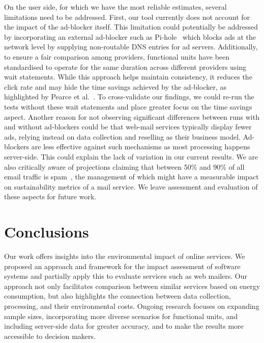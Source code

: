 \documentclass[sigconf,9pt,usenames,dvipsnames,table]{acmart}
\begin{document}
On the user side, for which we have the most reliable estimates, several
limitations need to be addressed. First, our tool currently does not
account for the impact of the ad-blocker itself. This limitation could
potentially be addressed by incorporating an external ad-blocker such as
Pi-hole~\cite{OverviewPiholePihole} which blocks ads at the network level
by supplying non-routable DNS entries for ad servers. Additionally, to ensure a fair comparison among providers, functional units have been standardised to operate for the same duration across different providers using wait statements. While this approach helps maintain consistency, it reduces the click rate and may hide the time savings achieved by the ad-blocker, as highlighted by Pearce et al.~\cite{pearce2020energy}. To cross-validate our findings, we could re-run the tests without these wait statements and place greater focus on the time savings aspect.
Another reason for not observing significant differences between runs with
and without ad-blockers could be that web-mail services typically display
fewer ads, relying instead on data collection and reselling as their
business model. Ad-blockers are less effective against such mechanisms as
most processing happens server-side. This could explain the lack of
variation in our current results. We are also critically aware of
projections claiming that between 50\% and 90\% of all email traffic is
spam~\cite{statistaspam2024,fu2014detecting}, the management
of which might have a measurable impact on sustainability metrics of a mail
service. We leave assessment and evaluation of these aspects for future
work.

\section{Conclusions}

Our work offers insights into the environmental impact of online
services. We proposed an approach and framework for the impact
assessment of software systems and partially apply this to evaluate
services such as web mailers. Our approach not
only facilitates comparison between similar services based on energy
consumption, but also highlights the connection between data collection,
processing, and their environmental costs. Ongoing research focuses on
expanding sample sizes, incorporating more diverse scenarios for functional
units, and including server-side data for greater accuracy, and to make the
results more accessible to decision makers.

\begin{acks}
  
\end{acks}
\balance



\balance
\end{document}
